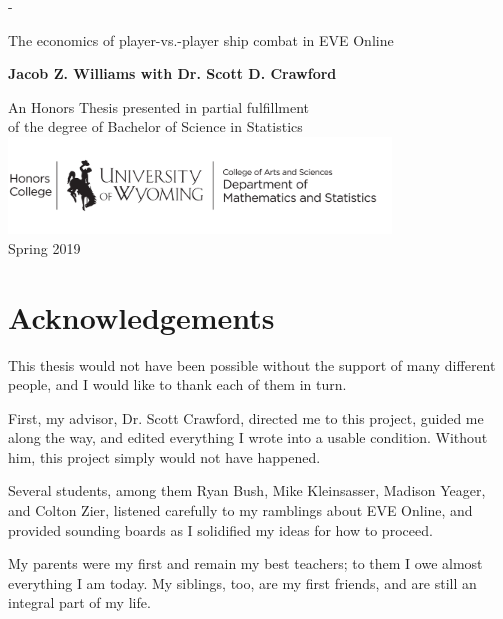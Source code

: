 \documentclass[letterpaper,12pt,article]{memoir}
\begin{document}
\thispagestyle{titlingpage}
\begin{titlingpage}
\calccentering\unitlength
\begin{adjustwidth}{\unitlength}{-\unitlength}
\begin{center}
    \vspace*{1cm}
    \Huge
    The economics of player-vs.-player ship combat in EVE Online
    
    \vspace{3cm}

    \normalsize    
    \textbf{Jacob Z. Williams with Dr. Scott D. Crawford}
    
    \vfill
    
    An Honors Thesis presented in partial fulfillment \\
    of the degree of Bachelor of Science in Statistics \\
    \includegraphics[width=4in]{UWLogos_seniorThesis_black.png} \\
    Spring 2019
\end{center}
\end{adjustwidth}
\end{titlingpage}


\frontmatter

\section*{Acknowledgements}
This thesis would not have been possible without the support of many different
people, and I would like to thank each of them in turn. 

First, my advisor, Dr. Scott Crawford, directed me to this project, guided me
along the way, and edited everything I wrote into a usable condition. Without
him, this project simply would not have happened.

Several students, among them Ryan Bush, Mike Kleinsasser, Madison Yeager, and 
Colton Zier, listened carefully to my ramblings about EVE Online, and provided
sounding boards as I solidified my ideas for how to proceed.

My parents were my first and remain my best teachers; to them I owe almost 
everything I am today. My siblings, too, are my first friends, and are still
an integral part of my life.
\end{document}
